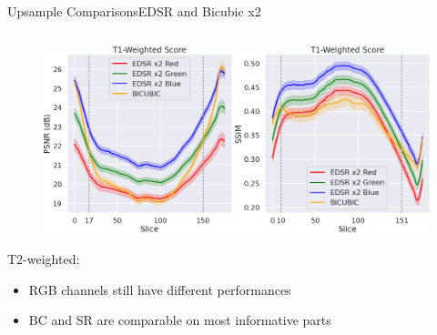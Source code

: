\documentclass[10pt, unicode]{beamer}
\begin{document}
\begin{frame}{Upsample Comparisons}{EDSR and Bicubic x2}
\begin{columns}
    \begin{column}{0.5\textwidth}
      \begin{figure}
        \vspace{-1.6cm}
        \includegraphics[scale=0.14]{./images/EDSR_score_slide_t1_all.png} 
      \end{figure}
      \vspace{0.3cm}
      T2-weighted:
      \begin{itemize}
        \item RGB channels still have different performances 
        \item BC and SR are comparable on most informative parts
      \end{itemize}

    \end{column}
  \end{columns}  

\end{frame}
\end{document}

